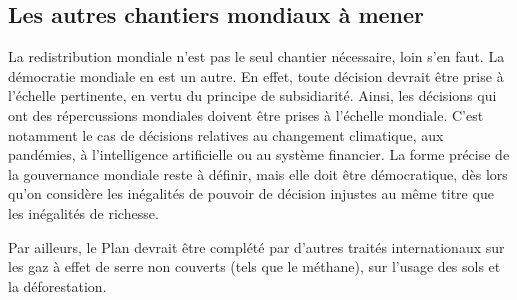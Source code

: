 \documentclass[a5paper,french,openany]{memoir}
\begin{document}
\subsection{Les autres chantiers mondiaux à mener}
La redistribution mondiale n'est pas le seul chantier nécessaire, loin s'en faut. La démocratie mondiale en est un autre. %
En effet, toute décision devrait être prise à l'échelle pertinente, en vertu du principe de subsidiarité. Ainsi, les décisions qui ont des répercussions mondiales doivent être prises à l'échelle mondiale. %
C'est notamment le cas de décisions relatives au changement climatique, aux pandémies, à l'intelligence artificielle ou au système financier. %
La forme précise de la gouvernance mondiale reste à définir, mais elle doit être démocratique, dès lors qu'on considère les inégalités de pouvoir de décision injustes au même titre que les inégalités de richesse. %

Par ailleurs, le Plan devrait être complété par d'autres traités internationaux sur les gaz à effet de serre non couverts (tels que le méthane), sur l'usage des sols et la déforestation. 
\end{document}
